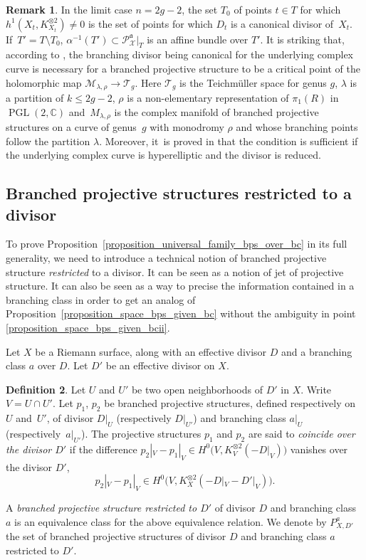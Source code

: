 \documentclass[JEP,XML,SOM,Unicode,NoEqCountersInSection,published]{cedram}
\DeclareMathOperator{\PGL}{PGL}
\theoremstyle{definition}
\newtheorem{definition}{Definition}[subsection]
\newtheorem{remark}[definition]{Remark}
\theoremstyle{plain}
\begin{document}
\begin{remark}
In the limit case $n = 2g-2$, the set $T_0$ of points $t \in T$ for which $h^1(X_t, K_{X_t}^{\otimes 2}) \neq 0$ is the set of points for which $D_t$ is a canonical divisor of~$X_t$. If~\hbox{$T' = T \setminus T_0$}, $\alpha^{-1}(T') \subset \mathcal P_{\mathcal X}^{\mathfrak a}|_{T}$ is an affine bundle over $T'$.
It is striking that, according to \cite{francaviglia-ruffoni}, the branching divisor being canonical for the underlying complex curve is necessary for a branched projective structure to be a critical point of the holomorphic map $\mathcal M_{\lambda, \rho} \to \mathcal T_g$. Here $\mathcal T_g$ is the Teichmüller space for genus $g$, $\lambda$ is a partition of $k \le 2g-2$, $\rho$ is a non-elementary representation of $\pi_1(R)$ in $\PGL(2, \mathbb C)$ and~$M_{\lambda, \rho}$ is the complex manifold of branched projective structures on a curve of genus~$g$ with monodromy $\rho$ and whose branching points follow the partition $\lambda$.
\hbox{Moreover}, it~is proved in \cite{francaviglia-ruffoni} that the condition is sufficient if the underlying complex curve is hyperelliptic and the divisor is reduced.
\end{remark}

\subsection{Branched projective structures restricted to a divisor}

To prove Proposition~\ref{proposition_universal_family_bps_over_bc} in its full generality, we need to introduce a technical notion of branched projective structure \emph{restricted} to a divisor.
It can be seen as a notion of jet of projective structure.
It can also be seen as a way to precise the information contained in a branching class in order to get an analog of Proposition~\ref{proposition_space_bps_given_bc} without the ambiguity in point \eqref{proposition_space_bps_given_bcii}.

Let $X$ be a Riemann surface, along with an effective divisor $D$ and a branching class $a$ over $D$.
Let $D'$ be an effective divisor on $X$.

\begin{definition}
Let $U$ and $U'$ be two open neighborhoods of $D'$ in $X$. Write $V = U \cap U'$.
Let $p_1$, $p_2$ be branched projective structures, defined respectively on~$U$ and~$U'$, of divisor $D|_U$ (respectively $D|_{U'}$) and branching class $a|_U$ (respectively~$a|_{U'}$). The projective structures $p_1$ and $p_2$ are said to \emph{coincide over the divisor $D'$} if the difference $p_2|_V - p_1|_V \in H^0\bigl(V, K_V^{\otimes 2}(-D|_V)\bigr)$ vanishes over the divisor $D'$, \ie
\[
p_2|_V-p_1|_V \in H^0\bigl(V, K_X^{\otimes 2}\left(-D|_V-D'|_V\right)\bigr).
\]

A \emph{branched projective structure restricted to $D'$} of divisor $D$ and branching class $a$ is an equivalence class for the above equivalence relation.
We denote by $P_{X, D'}^a$ the set of branched projective structures of divisor $D$ and branching class $a$ restricted to $D'$.
\end{definition}
\end{document}
